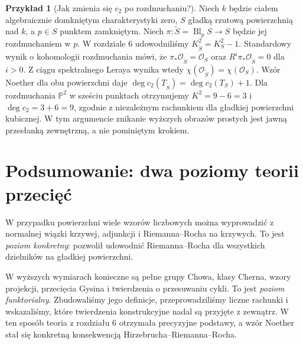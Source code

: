 \documentclass[11pt,a4paper,openany]{report}
\numberwithin{equation}{section}
\theoremstyle{plain}
\theoremstyle{definition}
\newtheorem{przyklad}[twierdzenie]{Przykład}
\theoremstyle{remark}
\newcommand{\PP}{\mathbb P}
\begin{document}
\begin{przyklad}[Jak zmienia się $c_2$ po rozdmuchaniu?]
\label{prz:ga7-blowup-c2}
Niech $k$ będzie ciałem algebraicznie domkniętym
charakterystyki zero, $S$ gładką rzutową powierzchnią
nad $k$, a $p\in S$ punktem zamkniętym.
Niech $\pi:\widetilde S=\operatorname{Bl}_pS\to S$
będzie jej rozdmuchaniem w $p$.
W rozdziale 6 udowodniliśmy
$K_{\widetilde S}^2=K_S^2-1$.
Standardowy wynik o kohomologii rozdmuchania mówi, że
$\pi_*\mathcal O_{\widetilde S}=\mathcal O_S$ oraz
$R^i\pi_*\mathcal O_{\widetilde S}=0$ dla $i>0$.
Z ciągu spektralnego Leraya wynika wtedy
$\chi(\mathcal O_{\widetilde S})=\chi(\mathcal O_S)$.
Wzór Noether dla obu powierzchni daje
$\deg c_2(T_{\widetilde S})=\deg c_2(T_S)+1$.
Dla rozdmuchania $\PP^2$ w sześciu punktach otrzymujemy
$K^2=9-6=3$ i $\deg c_2=3+6=9$, zgodnie
z niezależnym rachunkiem dla gładkiej powierzchni kubicznej.
W tym argumencie znikanie wyższych obrazów prostych
jest jawną przesłanką zewnętrzną, a nie pominiętym krokiem.
\end{przyklad}

\section{Podsumowanie: dwa poziomy teorii przecięć}
\label{sec:ga7-summary}

W przypadku powierzchni wiele wzorów liczbowych można
wyprowadzić z normalnej wiązki krzywej, adjunkcji
i Riemanna--Rocha na krzywych. To jest \emph{poziom
konkretny}: pozwolił udowodnić Riemanna--Rocha dla
wszystkich dzielników na gładkiej powierzchni.

W wyższych wymiarach konieczne są pełne grupy Chowa,
klasy Cherna, wzory projekcji, przecięcia Gysina
i twierdzenia o przesuwaniu cykli. To jest
\emph{poziom funktorialny}. Zbudowaliśmy jego definicje,
przeprowadziliśmy liczne rachunki i wskazaliśmy,
które twierdzenia konstrukcyjne nadal są przyjęte
z zewnątrz. W ten sposób teoria z rozdziału 6
otrzymała precyzyjne podstawy, a wzór Noether
stał się konkretną konsekwencją
Hirzebrucha--Riemanna--Rocha.
\end{document}
